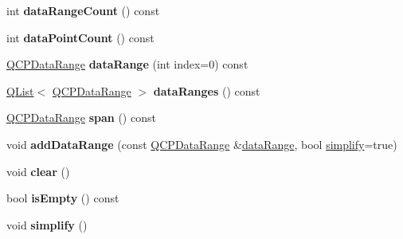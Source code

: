 \begin{DoxyCompactItemize}
\item 
\mbox{\label{class_q_c_p_data_selection_abd8869ccb231ab991e8576de931f647d}} 
int {\bfseries data\+Range\+Count} () const
\item 
\mbox{\label{class_q_c_p_data_selection_ac9e74dd294778aa799216c3435c9c4f0}} 
int {\bfseries data\+Point\+Count} () const
\item 
\mbox{\label{class_q_c_p_data_selection_a6956acf6a9a49a353b4f9b58608978ad}} 
\hyperlink{class_q_c_p_data_range}{Q\+C\+P\+Data\+Range} {\bfseries data\+Range} (int index=0) const
\item 
\mbox{\label{class_q_c_p_data_selection_a59e358db08c44d30aa7b5c4d76f55065}} 
\hyperlink{class_q_list}{Q\+List}$<$ \hyperlink{class_q_c_p_data_range}{Q\+C\+P\+Data\+Range} $>$ {\bfseries data\+Ranges} () const
\item 
\mbox{\label{class_q_c_p_data_selection_a890f9291e0b7f065747040de5d68ff7d}} 
\hyperlink{class_q_c_p_data_range}{Q\+C\+P\+Data\+Range} {\bfseries span} () const
\item 
\mbox{\label{class_q_c_p_data_selection_a46740c5aa7b80ae9b2abf6985d61b74f}} 
void {\bfseries add\+Data\+Range} (const \hyperlink{class_q_c_p_data_range}{Q\+C\+P\+Data\+Range} \&\hyperlink{class_q_c_p_data_selection_a6956acf6a9a49a353b4f9b58608978ad}{data\+Range}, bool \hyperlink{class_q_c_p_data_selection_a4a2fbad1a6e4d1dd26fdfdf88956f2a4}{simplify}=true)
\item 
\mbox{\label{class_q_c_p_data_selection_a385dd665e6690d39afb8bbd727b1e00b}} 
void {\bfseries clear} ()
\item 
\mbox{\label{class_q_c_p_data_selection_a7f7526b475998dc0c3d6c376b24736c9}} 
bool {\bfseries is\+Empty} () const
\item 
\mbox{\label{class_q_c_p_data_selection_a4a2fbad1a6e4d1dd26fdfdf88956f2a4}} 
void {\bfseries simplify} ()
\item 

\end{DoxyCompactItemize}
